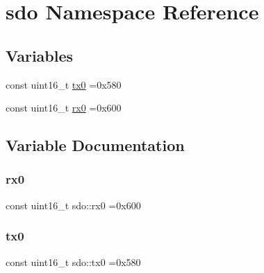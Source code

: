 \hypertarget{namespacesdo}{}\section{sdo Namespace Reference}
\label{namespacesdo}
\subsection*{Variables}
\begin{DoxyCompactItemize}
\item 
const uint16\+\_\+t \hyperlink{namespacesdo_ada4eb9ed2535da14a1b4c449b52c98b6}{tx0} =0x580
\item 
const uint16\+\_\+t \hyperlink{namespacesdo_a32e87699bc0a4deed591fb38703c48f2}{rx0} =0x600
\end{DoxyCompactItemize}


\subsection{Variable Documentation}
\mbox{\label{namespacesdo_a32e87699bc0a4deed591fb38703c48f2}} 
\subsubsection{\texorpdfstring{rx0}{rx0}}
{\footnotesize\ttfamily const uint16\+\_\+t sdo\+::rx0 =0x600}

\mbox{\label{namespacesdo_ada4eb9ed2535da14a1b4c449b52c98b6}} 
\subsubsection{\texorpdfstring{tx0}{tx0}}
{\footnotesize\ttfamily const uint16\+\_\+t sdo\+::tx0 =0x580}

